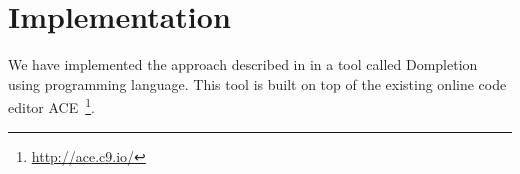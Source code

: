 \section{Implementation}
\label{Sec:Implementation}

We have implemented the approach described in  in a tool called Dompletion using \javascript programming language. This tool is built on top of the existing online code editor ACE~\footnote{\url{http://ace.c9.io/}}.


